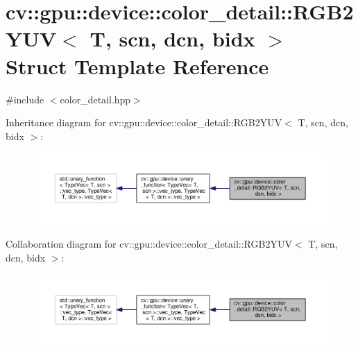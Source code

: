 \hypertarget{structcv_1_1gpu_1_1device_1_1color__detail_1_1RGB2YUV}{\section{cv\-:\-:gpu\-:\-:device\-:\-:color\-\_\-detail\-:\-:R\-G\-B2\-Y\-U\-V$<$ T, scn, dcn, bidx $>$ Struct Template Reference}
\label{structcv_1_1gpu_1_1device_1_1color__detail_1_1RGB2YUV}
}


{\ttfamily \#include $<$color\-\_\-detail.\-hpp$>$}



Inheritance diagram for cv\-:\-:gpu\-:\-:device\-:\-:color\-\_\-detail\-:\-:R\-G\-B2\-Y\-U\-V$<$ T, scn, dcn, bidx $>$\-:\nopagebreak
\begin{figure}[H]
\begin{center}
\leavevmode
\includegraphics[width=350pt]{structcv_1_1gpu_1_1device_1_1color__detail_1_1RGB2YUV__inherit__graph}
\end{center}
\end{figure}


Collaboration diagram for cv\-:\-:gpu\-:\-:device\-:\-:color\-\_\-detail\-:\-:R\-G\-B2\-Y\-U\-V$<$ T, scn, dcn, bidx $>$\-:\nopagebreak
\begin{figure}[H]
\begin{center}
\leavevmode
\includegraphics[width=350pt]{structcv_1_1gpu_1_1device_1_1color__detail_1_1RGB2YUV__coll__graph}
\end{center}
\end{figure}
